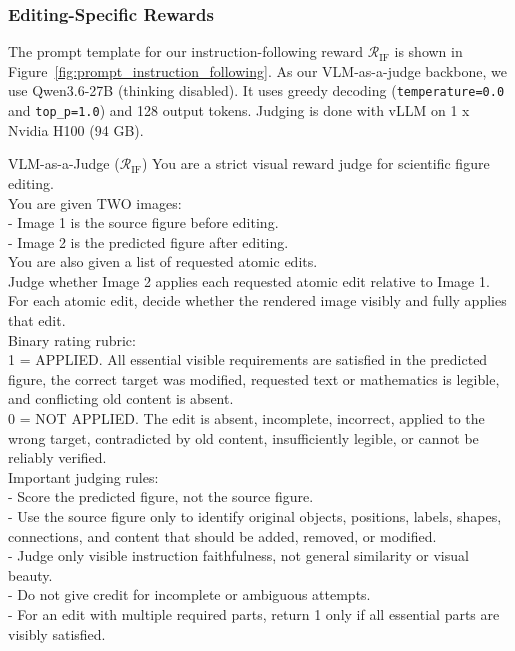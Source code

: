 \subsubsection{Editing-Specific Rewards}
\label{subsubsec:Editing-Specific Rewards}
The prompt template for our instruction-following reward $\mathcal{R}_{\mathrm{IF}}$ is shown in Figure~\ref{fig:prompt_instruction_following}. As our VLM-as-a-judge backbone, we use Qwen3.6-27B (thinking disabled). It uses greedy decoding (\texttt{temperature=0.0} and \texttt{top\_p=1.0}) and 128 output tokens. Judging is done with vLLM on 1 x Nvidia H100 (94 GB).
\begin{PromptBox}{VLM-as-a-Judge ($\mathcal{R}_{\mathrm{IF}}$)}
You are a strict visual reward judge for scientific figure editing. \\
You are given TWO images: \\
- Image 1 is the source figure before editing. \\
- Image 2 is the predicted figure after editing. \\
You are also given a list of requested atomic edits. \\
Judge whether Image 2 applies each requested atomic edit relative to Image 1. \\
For each atomic edit, decide whether the rendered image visibly and fully applies that edit. \\
Binary rating rubric: \\
1 = APPLIED. All essential visible requirements are satisfied in the predicted figure, the correct target was modified, requested text or mathematics is legible, and conflicting old content is absent. \\
0 = NOT APPLIED. The edit is absent, incomplete, incorrect, applied to the wrong target, contradicted by old content, insufficiently legible, or cannot be reliably verified. \\
Important judging rules: \\
- Score the predicted figure, not the source figure. \\
- Use the source figure only to identify original objects, positions, labels, shapes, connections, and content that should be added, removed, or modified. \\
- Judge only visible instruction faithfulness, not general similarity or visual beauty. \\
- Do not give credit for incomplete or ambiguous attempts. \\
- For an edit with multiple required parts, return 1 only if all essential parts are visibly satisfied. \\

\end{PromptBox}
